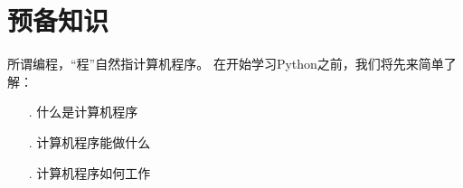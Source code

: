 \part{预备知识}

所谓编程，“程”自然指计算机程序。
在开始学习Python之前，我们将先来简单了解：\\
\begin{itemize}
\item[.]什么是计算机程序
\item[.]计算机程序能做什么
\item[.]计算机程序如何工作
\end{itemize}



